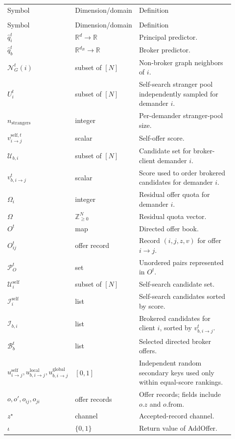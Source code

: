 \documentclass[11pt]{article}
\makeatletter
\newcommand{\R}{\mathbb{R}}
\newcommand{\procAddOffer}{AddOffer}
\newcommand{\procOfferMarket}{OfferMarket}
\newenvironment{localvartable}[1]{%
\begingroup
\small
\setlength{\tabcolsep}{4pt}
\renewcommand{\arraystretch}{1.08}
\begin{longtable}{>{\raggedright\arraybackslash}p{0.23\linewidth}
                >{\raggedright\arraybackslash}p{0.18\linewidth}
                >{\raggedright\arraybackslash}p{0.51\linewidth}}
\toprule
\multicolumn{3}{@{}l}{\textit{Local variables for #1}}\\
\midrule
Symbol & Dimension/domain & Definition \\
\midrule
\endfirsthead
\toprule
\multicolumn{3}{@{}l}{\textit{Local variables for #1 (continued)}}\\
\midrule
Symbol & Dimension/domain & Definition \\
\midrule
\endhead
}{%
\bottomrule
\end{longtable}
\endgroup
}
\makeatother
\begin{document}
\begin{localvartable}{\procOfferMarket}
$\hat q_i^t$ & $\R^d\to\R$ & Principal predictor. \\
$\hat q_b^t$ & $\R^{d_B}\to\R$ & Broker predictor. \\
$\mathcal N_G^t(i)$ & subset of $[N]$ & Non-broker graph neighbors of $i$. \\
$U_i^t$ & subset of $[N]$ & Self-search stranger pool independently sampled for demander $i$. \\
$n_{\mathrm{strangers}}$ & integer & Per-demander stranger-pool size. \\
$v_{i\to j}^{\mathrm{self},t}$ & scalar & Self-offer score. \\
$\mathcal U_{b,i}$ & subset of $[N]$ & Candidate set for broker-client demander $i$. \\
$v_{b,i\to j}^t$ & scalar & Score used to order brokered candidates for demander $i$. \\
$\Omega_i$ & integer & Residual offer quota for demander $i$. \\
$\Omega$ & $\mathbb Z_{\ge0}^N$ & Residual quota vector. \\
$O^t$ & map & Directed offer book. \\
$O_{ij}^t$ & offer record & Record $(i,j,z,v)$ for offer $i\to j$. \\
$\mathcal P_O^t$ & set & Unordered pairs represented in $O^t$. \\
$\mathcal U_i^{\mathrm{self}}$ & subset of $[N]$ & Self-search candidate set. \\
$\mathcal I_i^{\mathrm{self}}$ & list & Self-search candidates sorted by score. \\
$\mathcal I_{b,i}$ & list & Brokered candidates for client $i$, sorted by $v_{b,i\to j}^t$. \\
$\mathcal B_b^t$ & list & Selected directed broker offers. \\
$u_{i\to j}^{\mathrm{self}},u_{b,i\to j}^{\mathrm{local}},u_{b,i\to j}^{\mathrm{global}}$ & $[0,1]$ & Independent random secondary keys used only within equal-score rankings. \\
$o,o',o_{ij},o_{ji}$ & offer records & Offer records; fields include $o.z$ and $o.\mathrm{from}$. \\
$z^\star$ & channel & Accepted-record channel. \\
$\iota$ & $\{0,1\}$ & Return value of \procAddOffer. \\
\end{localvartable}
\end{document}
